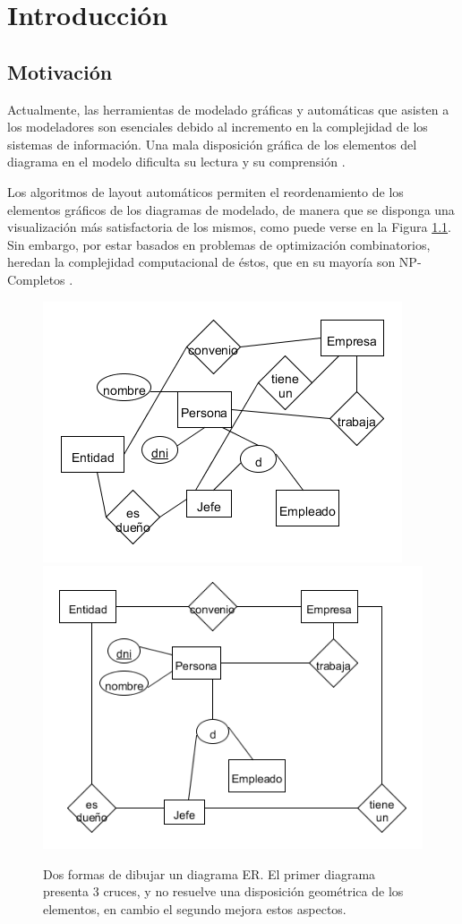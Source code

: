 \chapter{Introducci\'on}\label{cap1}

\section{Motivaci\'on}
Actualmente, las herramientas de  modelado gráficas  y automáticas que asisten a los  modeladores son esenciales  debido al incremento  en la complejidad de los sistemas de información. Una mala disposición gráfica de los elementos del diagrama en el modelo dificulta su lectura y su comprensión \cite{Sto14,Sto11,Huang07,ware02}. %
	
	Los algoritmos de layout automáticos permiten el reordenamiento de los elementos gráficos de los diagramas de modelado, de manera que se disponga una visualización más satisfactoria de los mismos, como puede verse en la Figura \ref{fig:ejemplo_crossnum}.
	Sin embargo, por estar basados en problemas de optimización combinatorios, heredan la  complejidad computacional de éstos,  que en su mayoría  son  NP-Completos \cite{Papadimitriou1976, Garey:1974}. 
	
	\begin{figure}[h]
		\centering
		\includegraphics[width=.4\textwidth]{imagenes/ejemplo_malo.png}
		\hspace{1.5cm}
		\includegraphics[width=.4\textwidth]{imagenes/ejemplo_bueno.png}
		\caption{Dos formas de dibujar un diagrama ER. El primer diagrama presenta 3 cruces, y no resuelve una disposición geométrica de los elementos, en cambio el segundo mejora estos aspectos.}
		\label{fig:ejemplo_crossnum}
	\end{figure}
	
